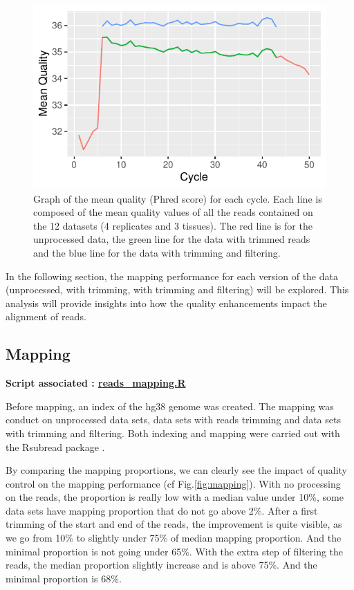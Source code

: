 \documentclass[a4paper, 11pt]{article}
\begin{document}
\begin{multicols}{2}
\begin{figure}[H]
    \centering
    \includegraphics[width=1\columnwidth]{Figures/QC_plots/mean_per_group_and_cycles.pdf}
    \caption{\footnotesize{ Graph of the mean quality (Phred score) for each cycle. Each line is composed of the mean quality values of all the reads contained on the 12 datasets (4 replicates and 3 tissues). The red line is for the unprocessed data, the green line for the data with trimmed reads and the blue line for the data with trimming and filtering.}}
    \label{fig:cycles_mean}
\end{figure}

In the following section, the mapping performance for each version of the data (unprocessed, with trimming, with trimming and filtering) will be explored. This analysis will provide insights into how the quality enhancements impact the alignment of reads.

\subsection{Mapping}
\begin{scriptsize}
	\textbf{Script associated : \href{https://github.com/leopoldguyot/BINF-402_Transcriptomic_Project/blob/main/reads_mapping.R}{reads\_mapping.R}} 
\end{scriptsize}


Before mapping, an index of the hg38 genome was created. The mapping was conduct on unprocessed data sets, data sets with reads trimming and data sets with trimming and filtering. Both indexing and mapping were carried out with the Rsubread package \citep{Rsubread}.

By comparing the mapping proportions, we can clearly see the impact of quality control on the mapping performance (cf Fig.\ref{fig:mapping}). With no processing on the reads, the proportion is really low with a median value under 10\%, some data sets have mapping proportion that do not go above 2\%. After a first trimming of the start and end of the reads, the improvement is quite visible, as we go from 10\% to slightly under 75\% of median mapping proportion. And the minimal proportion is not going under 65\%. With the extra step of filtering the reads, the median proportion slightly increase and is above 75\%. And the minimal proportion is 68\%. 



\end{multicols}
\end{document}
